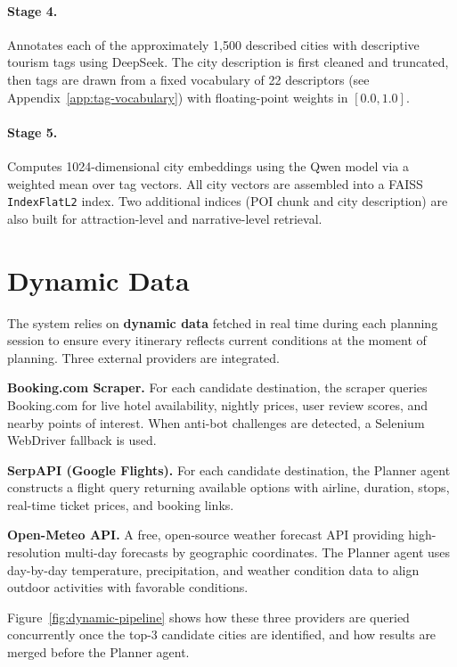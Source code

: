 \documentclass[12pt,a4paper]{report}
\begin{document}
\paragraph{Stage 4.} Annotates each of the approximately 1,500 described cities with descriptive
tourism tags using DeepSeek. The city description is first cleaned and truncated, then tags are drawn
from a fixed vocabulary of 22 descriptors (see Appendix~\ref{app:tag-vocabulary}) with floating-point
weights in $[0.0, 1.0]$.

\paragraph{Stage 5.} Computes 1024-dimensional city embeddings using the Qwen model via a weighted
mean over tag vectors. All city vectors are assembled into a FAISS \texttt{IndexFlatL2} index.
Two additional indices (POI chunk and city description) are also built for attraction-level and
narrative-level retrieval.

\section{Dynamic Data}

The system relies on \textbf{dynamic data} fetched in real time during each planning session to
ensure every itinerary reflects current conditions at the moment of planning. Three external
providers are integrated.

\textbf{Booking.com Scraper.} For each candidate destination, the scraper queries Booking.com for
live hotel availability, nightly prices, user review scores, and nearby points of interest. When
anti-bot challenges are detected, a Selenium WebDriver fallback is used.

\textbf{SerpAPI (Google Flights).} For each candidate destination, the Planner agent constructs a
flight query returning available options with airline, duration, stops, real-time ticket prices, and
booking links.

\textbf{Open-Meteo API.} A free, open-source weather forecast API providing high-resolution
multi-day forecasts by geographic coordinates. The Planner agent uses day-by-day temperature,
precipitation, and weather condition data to align outdoor activities with favorable conditions.

Figure~\ref{fig:dynamic-pipeline} shows how these three providers are queried concurrently once
the top-3 candidate cities are identified, and how results are merged before the Planner agent.
\end{document}
